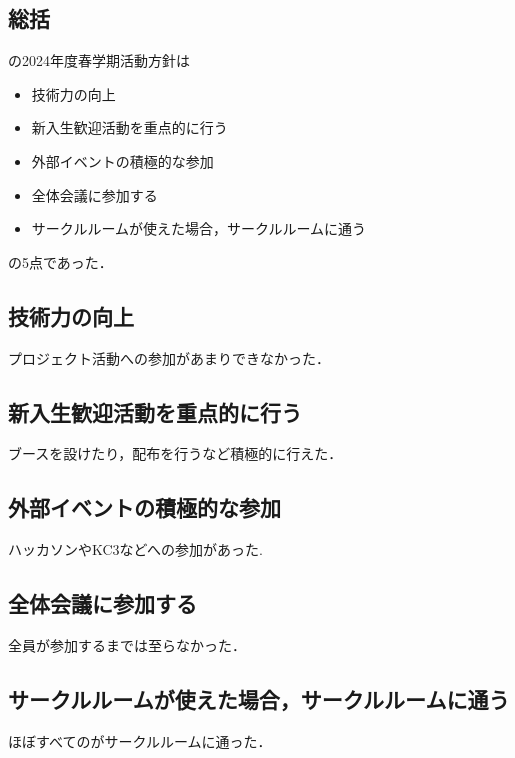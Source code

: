 \subsection*{\secondGrade{}総括}


\secondGrade{}の2024年度春学期活動方針は
\begin{itemize}
    \item 技術力の向上
    \item 新入生歓迎活動を重点的に行う
    \item 外部イベントの積極的な参加
    \item 全体会議に参加する
    \item サークルルームが使えた場合，サークルルームに通う
\end{itemize}
の5点であった．

\subsection*{技術力の向上}
プロジェクト活動への参加があまりできなかった．

\subsection*{新入生歓迎活動を重点的に行う}
ブースを設けたり，配布を行うなど積極的に行えた．

\subsection*{外部イベントの積極的な参加}
ハッカソンやKC3などへの参加があった.

\subsection*{全体会議に参加する}
全員が参加するまでは至らなかった．

\subsection*{サークルルームが使えた場合，サークルルームに通う}
ほぼすべての\secondGrade{}がサークルルームに通った．